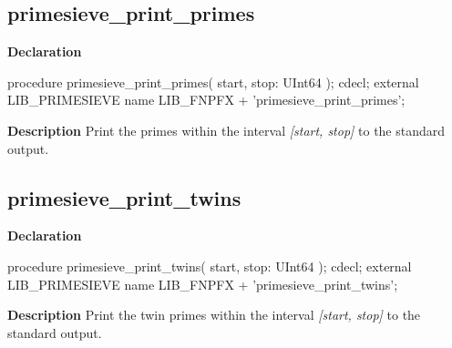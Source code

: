 \documentclass{report}
\newif\ifpdf
\begin{document}
\subsection*{primesieve{\_}print{\_}primes}
\fi
\label{primesieve-primesieve_print_primes}
\begin{list}{}{
\setlength{\itemindent}{0cm}
\setlength{\listparindent}{0cm}
\setlength{\leftmargin}{\evensidemargin}
\addtolength{\leftmargin}{\tmplength}
\settowidth{\labelsep}{X}
\addtolength{\leftmargin}{\labelsep}
\setlength{\labelwidth}{\tmplength}
}
\item[\textbf{Declaration}\hfill]
\ifpdf
\begin{flushleft}
\fi
\begin{ttfamily}
procedure primesieve{\_}print{\_}primes( start, stop: UInt64 ); cdecl; external LIB{\_}PRIMESIEVE name LIB{\_}FNPFX + 'primesieve{\_}print{\_}primes';\end{ttfamily}

\ifpdf
\end{flushleft}
\fi

\par
\item[\textbf{Description}]
Print the primes within the interval \textit{[start, stop]} to the standard output.

\end{list}
\ifpdf
\subsection*{\large{\textbf{primesieve{\_}print{\_}twins}}\normalsize\hspace{1ex}\hrulefill}
\else
\subsection*{primesieve{\_}print{\_}twins}
\fi
\label{primesieve-primesieve_print_twins}
\begin{list}{}{
\setlength{\itemindent}{0cm}
\setlength{\listparindent}{0cm}
\setlength{\leftmargin}{\evensidemargin}
\addtolength{\leftmargin}{\tmplength}
\settowidth{\labelsep}{X}
\addtolength{\leftmargin}{\labelsep}
\setlength{\labelwidth}{\tmplength}
}
\item[\textbf{Declaration}\hfill]
\ifpdf
\begin{flushleft}
\fi
\begin{ttfamily}
procedure primesieve{\_}print{\_}twins( start, stop: UInt64 ); cdecl; external LIB{\_}PRIMESIEVE name LIB{\_}FNPFX + 'primesieve{\_}print{\_}twins';\end{ttfamily}

\ifpdf
\end{flushleft}
\fi

\par
\item[\textbf{Description}]
Print the twin primes within the interval \textit{[start, stop]} to the standard output.

\end{list}
\ifpdf
\end{document}
